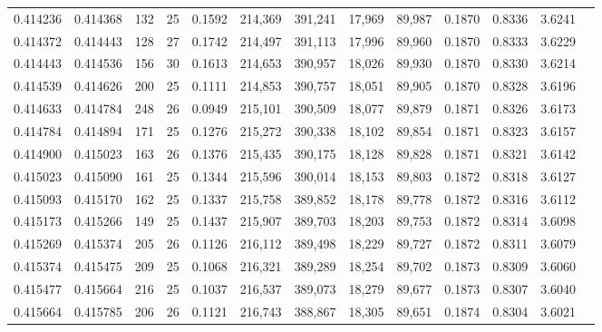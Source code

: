 \begin{tabular}{rrrrrrrrrrrrr}
0.414236 & 0.414368 & 132 &  25 &                                     0.1592 & 214,369 & 391,241 &  17,969 &  89,987 & 0.1870 & 0.8336 & 3.6241 \\
0.414372 & 0.414443 & 128 &  27 &                                     0.1742 & 214,497 & 391,113 &  17,996 &  89,960 & 0.1870 & 0.8333 & 3.6229 \\
0.414443 & 0.414536 & 156 &  30 &                                     0.1613 & 214,653 & 390,957 &  18,026 &  89,930 & 0.1870 & 0.8330 & 3.6214 \\
0.414539 & 0.414626 & 200 &  25 &                                     0.1111 & 214,853 & 390,757 &  18,051 &  89,905 & 0.1870 & 0.8328 & 3.6196 \\
0.414633 & 0.414784 & 248 &  26 &                                     0.0949 & 215,101 & 390,509 &  18,077 &  89,879 & 0.1871 & 0.8326 & 3.6173 \\
0.414784 & 0.414894 & 171 &  25 &                                     0.1276 & 215,272 & 390,338 &  18,102 &  89,854 & 0.1871 & 0.8323 & 3.6157 \\
0.414900 & 0.415023 & 163 &  26 &                                     0.1376 & 215,435 & 390,175 &  18,128 &  89,828 & 0.1871 & 0.8321 & 3.6142 \\
0.415023 & 0.415090 & 161 &  25 &                                     0.1344 & 215,596 & 390,014 &  18,153 &  89,803 & 0.1872 & 0.8318 & 3.6127 \\
0.415093 & 0.415170 & 162 &  25 &                                     0.1337 & 215,758 & 389,852 &  18,178 &  89,778 & 0.1872 & 0.8316 & 3.6112 \\
0.415173 & 0.415266 & 149 &  25 &                                     0.1437 & 215,907 & 389,703 &  18,203 &  89,753 & 0.1872 & 0.8314 & 3.6098 \\
0.415269 & 0.415374 & 205 &  26 &                                     0.1126 & 216,112 & 389,498 &  18,229 &  89,727 & 0.1872 & 0.8311 & 3.6079 \\
0.415374 & 0.415475 & 209 &  25 &                                     0.1068 & 216,321 & 389,289 &  18,254 &  89,702 & 0.1873 & 0.8309 & 3.6060 \\
0.415477 & 0.415664 & 216 &  25 &                                     0.1037 & 216,537 & 389,073 &  18,279 &  89,677 & 0.1873 & 0.8307 & 3.6040 \\
0.415664 & 0.415785 & 206 &  26 &                                     0.1121 & 216,743 & 388,867 &  18,305 &  89,651 & 0.1874 & 0.8304 & 3.6021 \\

\end{tabular}
